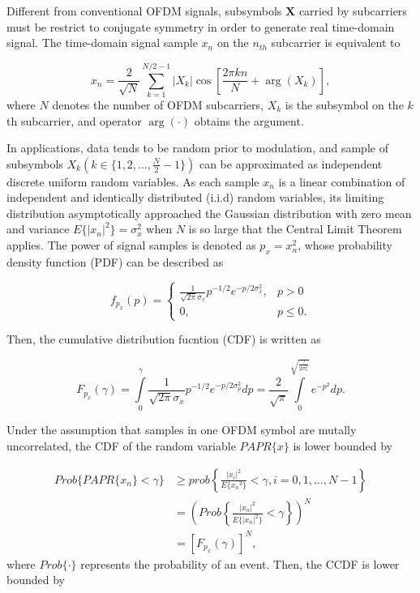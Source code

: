 \documentclass[9pt,twocolumn,twoside]{osajnl}
\begin{document}
Different from conventional OFDM signals, subsymbols $\mathbf{X}$ carried by subcarriers must be restrict to conjugate 
symmetry in order to generate real time-domain signal. The time-domain signal sample $x_n$ on the $n_{th}$ subcarrier is equivalent to

\begin{equation}
  x_n = \frac{2}{\sqrt{N}} \sum\limits_{k=1}^{N/2-1} |X_k| \cos{\left[\frac{2 \pi kn}{N}+\arg (X_k)\right]},
\end{equation}
where $N$ denotes the number of OFDM subcarriers, $X_k$ is the subsymbol on the $k$th subcarrier, and operator $\arg( \cdot )$ obtains the argument.

In applications, data tends to be random prior to modulation, and sample of subsymbols $X_k \left(k \in \{1,2,\ldots,\frac{N}{2}-1\}\right)$ 
can be approximated as independent discrete uniform random variables. As each sample $x_n$ is a linear combination of independent and identically distributed (i.i.d) random variables, its 
limiting distribution asymptotically approached the Gaussian distribution with zero mean and variance $E\{{|x_n|}^2\}=\sigma_x^2$ when $N$ is so large that the Central Limit Theorem applies.
The power of signal samples is denoted as $p_x=x_n^2$, whose probability density function (PDF) can be described as 

\begin{equation}
  f_{p_x}\left(p\right) = \left\{ \begin{array}{ll}
    \frac{1}{\sqrt{2\pi}\sigma_x} p^{-1/2} e^{-p/2\sigma_x^2}, & p > 0 \\
    0, & p \leq 0. 
  \end{array} \right.
\end{equation}

Then, the cumulative distribution fucntion (CDF) is written as 

\begin{equation}
  F_{p_x}(\gamma)=\int\limits_{0}^{\gamma} \frac{1}{\sqrt{2\pi}\sigma_x} p^{-1/2} e^{-p/2\sigma_p^2}  dp = \frac{2}{\sqrt{\pi}} \int\limits_{0}^{\sqrt{\frac{\gamma}{2\sigma_x^2}}} e^{-p^2} dp.
\end{equation}

Under the assumption that samples in one OFDM symbol are mutally uncorrelated, the CDF of the random variable $PAPR\{x\}$ is lower bounded by 

\begin{align}
  Prob\{PAPR\{x_n\}<\gamma\} & \geq prob{\left\{\frac{{|x_i|}^2}{E\{{x_n}^2\}}<\gamma, i=0,1,\ldots,N-1 \right\}} \\
  & = {\left(Prob\left\{\frac{{|x_n|}^2}{E\{{|x_n|}^2\}}<\gamma\right\}\right)}^N \\
  & = {\left[F_{p_x}\left(\gamma\right)\right]}^N, 
\end{align}
where $Prob\{\cdot\}$ represents the probability of an event.
Then, the CCDF is lower bounded by 
\end{document}
